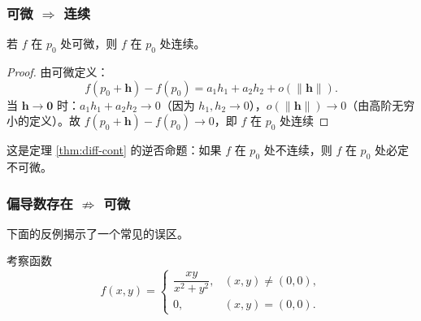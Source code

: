 \documentclass[lang=cn,11pt]{elegantbook}
\begin{document}
\subsubsection*{可微 $\Rightarrow$ 连续}

\begin{theorem}[可微蕴含连续] \label{thm:diff-cont}
若 $f$ 在 $p_0$ 处可微，则 $f$ 在 $p_0$ 处连续。
\end{theorem}

\begin{proof}
由可微定义：
\[
f(p_0+\boldsymbol h)-f(p_0)=a_1h_1+a_2h_2+o(\|\boldsymbol h\|).
\]
当 $\boldsymbol h\to\boldsymbol 0$ 时：$a_1h_1+a_2h_2\to 0$（因为 $h_1,h_2\to 0$），$o(\|\boldsymbol h\|)\to 0$（由高阶无穷小的定义）。故 $f(p_0+\boldsymbol h)-f(p_0)\to 0$，即 $f$ 在 $p_0$ 处连续
\end{proof}

\begin{corollary}
这是定理 \ref{thm:diff-cont} 的逆否命题：如果 $f$ 在 $p_0$ 处不连续，则 $f$ 在 $p_0$ 处必定不可微。
\end{corollary}

\subsubsection*{偏导数存在 $\nRightarrow$ 可微}

下面的反例揭示了一个常见的误区。

\begin{exercise}[偏导存在但不可微] \label{ex:pd-exist-not-diff}
考察函数
\[
f(x,y)=
\begin{cases}
\dfrac{xy}{x^2+y^2},&(x,y) \neq (0,0),\\[10pt]
0,&(x,y)=(0,0).
\end{cases}
\]
\end{exercise}
\end{document}
